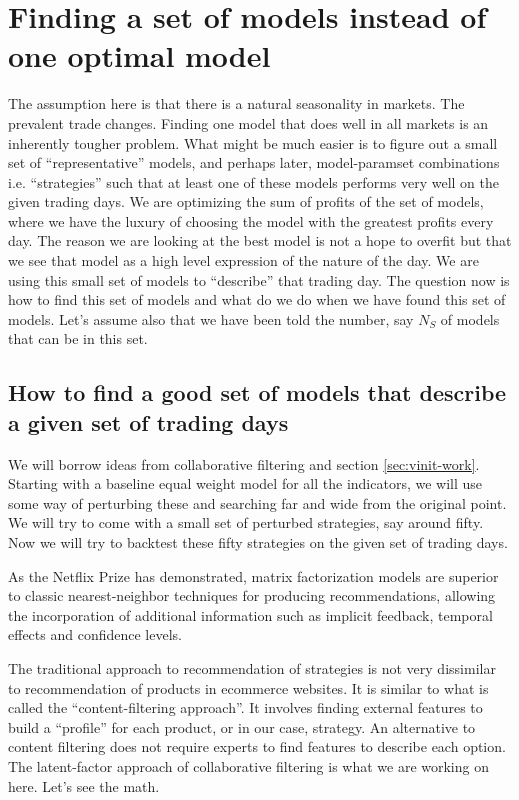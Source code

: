 \documentclass[a4paper]{article}
\begin{document}
\section{Finding a set of models instead of one optimal model}
\label{sec:optimal-set}
The assumption here is that there is a natural seasonality in
markets. The prevalent trade changes. Finding one model that does well
in all markets is an inherently tougher problem. What might be much
easier is to figure out a small set of ``representative'' models, and
perhaps later, model-paramset combinations i.e. ``strategies'' such
that at least one of these models performs very well on the given
trading days. We are optimizing the sum of profits of the set of
models, where we have the luxury of choosing the model with the
greatest profits every day. The reason we are looking at the best
model is not a hope to overfit but that we see that model as a high
level expression of the nature of the day. We are using this small set
of models to ``describe'' that trading day. The question now is how to
find this set of models and what do we do when we have found this set
of models. Let's assume also that we have been told the number, say $N_S$ of
models that can be in this set.

\subsection{How to find a good set of models that describe a given set
  of trading days}
\label{subsec:optimal-set-finding}
We will borrow ideas from collaborative filtering \cite{Koren2009}
\cite{Ruslan2007rbmnetflix} \cite{ZhouWilkinsonnetflix} and section
\ref{sec:vinit-work}. Starting with a baseline equal weight model for all
the indicators, we will use some way of perturbing these and searching
far and wide from the original point. We will try to come with a small
set of perturbed strategies, say around fifty. Now we will try to
backtest these fifty strategies on the given set of trading
days. 

As the Netflix Prize has demonstrated, matrix factorization models are 
superior to classic nearest-neighbor techniques for producing recommendations, 
allowing the incorporation of additional information such as implicit 
feedback, temporal effects and confidence levels.

The traditional approach to recommendation of strategies 
is not very dissimilar to recommendation of products in 
ecommerce websites. It is similar to what is called the 
``content-filtering approach''. It involves finding external 
features to build a ``profile'' for each product, or in our 
case, strategy. An alternative to content filtering does not 
require experts to find features to describe each option. 
The latent-factor approach of collaborative filtering is 
what we are working on here. Let's see the math.
\end{document}
